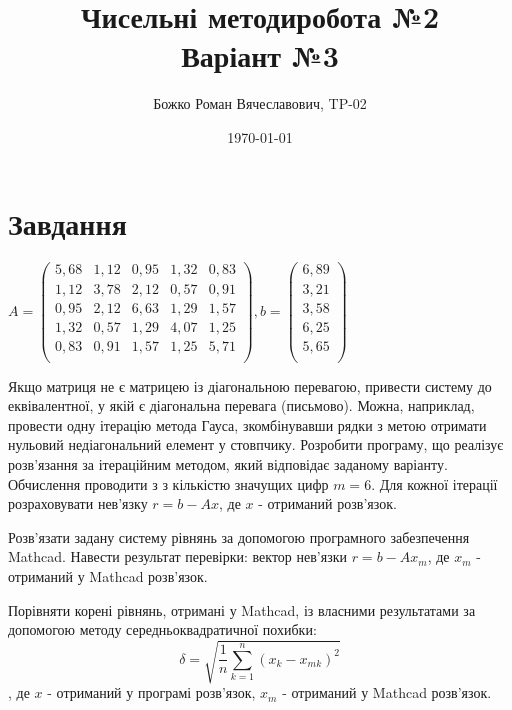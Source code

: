 \documentclass{report}
\begin{document}
\title{Чисельні методи робота №2\\Варіант №3}
\author{Божко Роман Вячеславович, TP-02}
\date{\today}

\maketitle

\section*{Завдання}
$A = 
\begin{pmatrix}
5,68 & 1,12 & 0,95 & 1,32 & 0,83\\
1,12 & 3,78 & 2,12 & 0,57 & 0,91\\
0,95 & 2,12 & 6,63 & 1,29 & 1,57\\
1,32 & 0,57 & 1,29 & 4,07 & 1,25\\
0,83 & 0,91 & 1,57 & 1,25 & 5,71\\
\end{pmatrix}, b = 
\begin{pmatrix}
6,89\\
3,21\\
3,58\\
6,25\\
5,65\\
\end{pmatrix}
$\par
Якщо матриця не є матрицею із діагональною перевагою, привести систему до
еквівалентної, у якій є діагональна перевага (письмово). Можна, наприклад, провести одну ітерацію метода Гауса, зкомбінувавши рядки з метою отримати нульовий недіагональний елемент у стовпчику. Розробити програму, що реалізує розв’язання за ітераційним методом, який відповідає заданому варіанту. Обчислення проводити з з кількістю значущих цифр $m = 6$. Для кожної ітерації розраховувати нев’язку $r = b - Ax$, де $x$ - отриманий розв’язок.\par
	Розв’язати задану систему рівнянь за допомогою програмного забезпечення Mathcad. Навести результат перевірки: вектор нев’язки $r = b - Ax_m$, де $x_m$ - отриманий у Mathcad розв’язок.\par
	Порівняти корені рівнянь, отримані у Mathcad, із власними результатами за допомогою методу середньоквадратичної похибки:
\[\delta=\sqrt{\frac{1}{n}\sum_{k=1}^{n} (x_k - x_{mk})^2}\],
де $x$ - отриманий у програмі розв’язок, $x_m$ - отриманий у Mathcad розв’язок.
\end{document}
